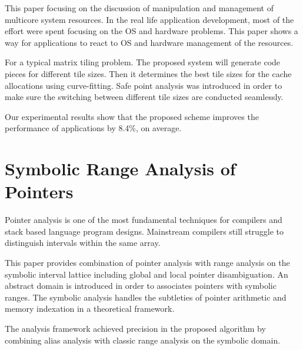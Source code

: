 \documentclass[11pt]{article}
\begin{document}
This paper focusing on the discussion of manipulation and management of multicore system resources. 
In the real life application development, most of the effort were spent focusing on the OS and hardware 
problems. This paper shows a way for applications to react to OS and hardware management of the resources. 

For a typical matrix tiling problem. The proposed system will generate code pieces for different tile sizes. 
Then it  determines the best tile sizes for the cache allocations  using curve-fitting. Safe point analysis was introduced
in order to make sure the switching between different tile sizes are conducted seamlessly. 

Our experimental results show that the proposed scheme improves the performance of applications by 8.4\%, on average.

\section{Symbolic Range Analysis of Pointers}
\label{sec:orgheadline8}
Pointer analysis is one of the most fundamental techniques for compilers and stack based language
program designs. Mainstream compilers still struggle to distinguish intervals within the same array. 

This paper provides combination of pointer analysis with range analysis on the symbolic interval lattice including
global and local pointer disambiguation.  An abstract domain is introduced  in order to associates pointers with symbolic ranges. 
The symbolic analysis handles the subtleties of pointer arithmetic and memory indexation in a theoretical framework.

The analysis framework achieved precision in the proposed algorithm by combining alias analysis with classic range analysis on the symbolic domain. 
\end{document}
